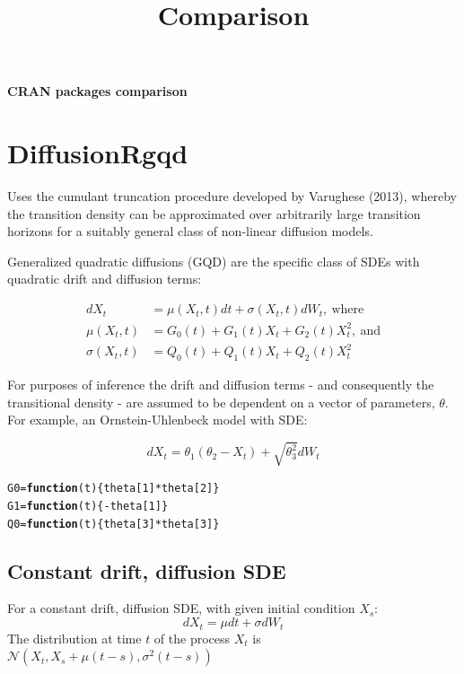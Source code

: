 \documentclass[a4paper,11pt]{article}\usepackage[]{graphicx}\usepackage[]{color}
\makeatletter
\newcommand{\hlnum}[1]{\textcolor[rgb]{0.686,0.059,0.569}{#1}}%
\newcommand{\hlopt}[1]{\textcolor[rgb]{0,0,0}{#1}}%
\newcommand{\hlstd}[1]{\textcolor[rgb]{0.345,0.345,0.345}{#1}}%
\newcommand{\hlkwa}[1]{\textcolor[rgb]{0.161,0.373,0.58}{\textbf{#1}}}%
\newcommand{\hlkwb}[1]{\textcolor[rgb]{0.69,0.353,0.396}{#1}}%
\newcommand{\hlkwc}[1]{\textcolor[rgb]{0.333,0.667,0.333}{#1}}%
\newenvironment{kframe}{%
 \def\at@end@of@kframe{}%
 \ifinner\ifhmode%
  \def\at@end@of@kframe{\end{minipage}}%
  \begin{minipage}{\columnwidth}%
 \fi\fi%
 \def\FrameCommand##1{\hskip\@totalleftmargin \hskip-\fboxsep
 \colorbox{shadecolor}{##1}\hskip-\fboxsep
     \hskip-\linewidth \hskip-\@totalleftmargin \hskip\columnwidth}%
 \MakeFramed {\advance\hsize-\width
   \@totalleftmargin\z@ \linewidth\hsize
   \@setminipage}}%
 {\par\unskip\endMakeFramed%
 \at@end@of@kframe}
\newenvironment{knitrout}{}{} %
\makeatother
\begin{document}
\pagestyle{empty}
\title{Comparison}
\begin{center}
\Large\textbf{CRAN packages comparison} \\[11pt]
\normalsize
\end{center}

\section{DiffusionRgqd}
Uses the cumulant truncation procedure developed by Varughese (2013), whereby the transition density can be approximated over arbitrarily large transition horizons for a suitably general class of non-linear diffusion models.

Generalized quadratic diffusions (GQD) are the specific class of SDEs with quadratic drift and diffusion terms:

\begin{align*}
d X_t & = \mu(X_t, t)dt + \sigma(X_t, t)dW_t, \: \text{where} \\
\mu(X_t, t) & = G_0(t) + G_1(t) X_t + G_2(t) X_t^2, \: \text{and} \\
\sigma (X_t, t) & = Q_0(t) + Q_1(t) X_t + Q_2(t) X_t^2
\end{align*}

For purposes of inference the drift and diffusion terms - and consequently the transitional density - are assumed to be dependent on a vector of parameters, $\theta$. For example, an Ornstein-Uhlenbeck model with SDE:

\begin{equation}
d X_t = \theta_1 (\theta_2 - X_t) + \sqrt{\theta_3^2} dW_t
\end{equation}

\begin{knitrout}
\color{fgcolor}\begin{kframe}
\begin{alltt}
\hlstd{G0}\hlkwb{=}\hlkwa{function}\hlstd{(}\hlkwc{t}\hlstd{)\{theta[}\hlnum{1}\hlstd{]}\hlopt{*}\hlstd{theta[}\hlnum{2}\hlstd{]\}}
\hlstd{G1}\hlkwb{=}\hlkwa{function}\hlstd{(}\hlkwc{t}\hlstd{)\{}\hlopt{-}\hlstd{theta[}\hlnum{1}\hlstd{]\}}
\hlstd{Q0}\hlkwb{=}\hlkwa{function}\hlstd{(}\hlkwc{t}\hlstd{)\{theta[}\hlnum{3}\hlstd{]}\hlopt{*}\hlstd{theta[}\hlnum{3}\hlstd{]\}}
\end{alltt}
\end{kframe}
\end{knitrout}

\subsection{Constant drift, diffusion SDE}
For a constant drift, diffusion SDE, with given initial condition $X_s$:
\begin{equation}
dX_t = \mu dt + \sigma dW_t
\end{equation}
The distribution at time $t$ of the process $X_t$ is $\mathcal{N}(X_t, X_s + \mu(t-s), \sigma^2(t-s))$
\end{document}
